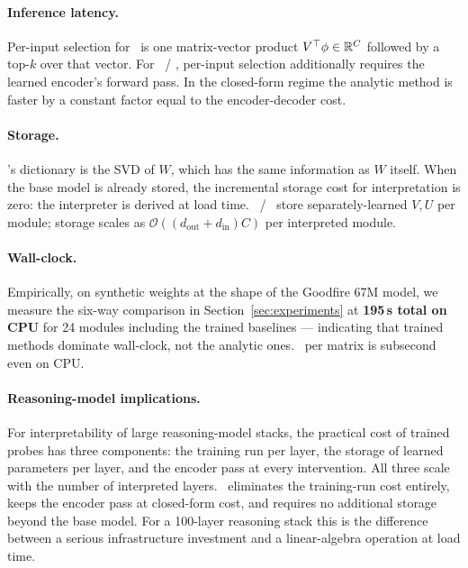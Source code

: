 \paragraph{Inference latency.} Per-input selection for \svdomp\ is one matrix-vector product $V^\top \phi \in \mathbb{R}^{C}$ followed by a top-$k$ over that vector. For \vpd\ / \bsf, per-input selection additionally requires the learned encoder's forward pass. In the closed-form regime the analytic method is faster by a constant factor equal to the encoder-decoder cost.

\paragraph{Storage.} \svdomp's dictionary is the SVD of $W$, which has the same information as $W$ itself. When the base model is already stored, the incremental storage cost for interpretation is zero: the interpreter is derived at load time. \vpd\ / \bsf\ store separately-learned $V, U$ per module; storage scales as $\mathcal{O}((d_\text{out} + d_\text{in}) C)$ per interpreted module.

\paragraph{Wall-clock.} Empirically, on synthetic weights at the shape of the Goodfire 67M model, we measure the six-way comparison in Section~\ref{sec:experiments} at \textbf{195\,s total on CPU} for 24 modules including the trained baselines --- indicating that trained methods dominate wall-clock, not the analytic ones. \svdomp\ per matrix is subsecond even on CPU.

\paragraph{Reasoning-model implications.} For interpretability of large reasoning-model stacks, the practical cost of trained probes has three components: the training run per layer, the storage of learned parameters per layer, and the encoder pass at every intervention. All three scale with the number of interpreted layers. \svdomp\ eliminates the training-run cost entirely, keeps the encoder pass at closed-form cost, and requires no additional storage beyond the base model. For a 100-layer reasoning stack this is the difference between a serious infrastructure investment and a linear-algebra operation at load time.
